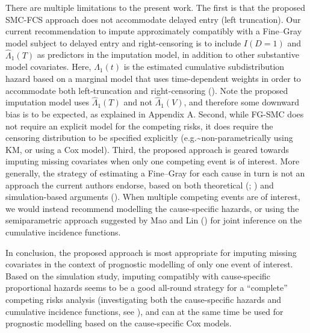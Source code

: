 \documentclass[
  letterpaper,
  DIV=11,
  numbers=noendperiod]{scrreprt}
\begin{document}
There are multiple limitations to the present work. The first is that
the proposed SMC-FCS approach does not accommodate delayed entry (left
truncation). Our current recommendation to impute approximately
compatibly with a Fine--Gray model subject to delayed entry and
right-censoring is to include \(I(D=1)\) and \(\hat{\Lambda}_1(T)\) as
predictors in the imputation model, in addition to other substantive
model covariates. Here, \(\hat{\Lambda}_1(t)\) is the estimated
cumulative subdistribution hazard based on a marginal model that uses
time-dependent weights in order to accommodate both left-truncation and
right-censoring
(). Note the proposed imputation model uses \(\hat{\Lambda}_1(T)\)
and not \(\hat{\Lambda}_1(V)\), and therefore some downward bias is to
be expected, as explained in Appendix A. Second, while FG-SMC does not
require an explicit model for the competing risks, it does require the
censoring distribution to be specified explicitly
(e.g.\textasciitilde non-parametrically using KM, or using a Cox model).
Third, the proposed approach is geared towards imputing missing
covariates when only one competing event is of interest. More generally,
the strategy of estimating a Fine--Gray for each cause in turn is not an
approach the current authors endorse, based on both theoretical
(;
) and simulation-based arguments
(). When multiple competing events are of interest, we would instead
recommend modelling the cause-specific hazards, or using the
semiparametric approach suggested by Mao and Lin
() for
joint inference on the cumulative incidence functions.

In conclusion, the proposed approach is most appropriate for imputing
missing covariates in the context of prognostic modelling of only one
event of interest. Based on the simulation study, imputing compatibly
with cause-specific proportional hazards seems to be a good all-round
strategy for a ``complete'' competing risks analysis (investigating both
the cause-specific hazards and cumulative incidence functions, see
), and can at the same time be used for prognostic modelling
based on the cause-specific Cox models.
\end{document}
